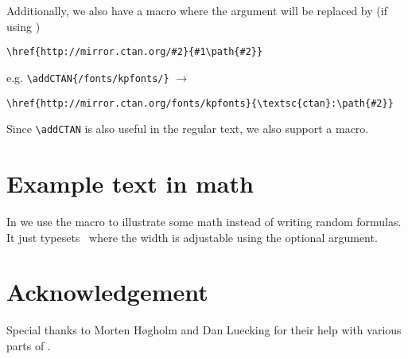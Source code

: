 \documentclass[11pt,oneside,a4paper,oldfontcommands,danish,english,article]{memoir}
\begin{document}
Additionally, we also have a  macro where the
argument will be replaced by (if using )
\begin{verbatim}
\href{http://mirror.ctan.org/#2}{#1\path{#2}}
\end{verbatim}
e.g. \verb+\addCTAN{/fonts/kpfonts/}+ $\to$
\begin{verbatim}
\href{http://mirror.ctan.org/fonts/kpfonts}{\textsc{ctan}:\path{#2}}
\end{verbatim}

Since \verb?\addCTAN? is also useful in the regular text, we also
support a  macro.


\section{Example text in math}
\label{sec:example-text-math}

In \cite{ltxb} we use the macro  to illustrate
some math instead of writing random formulas. It just typesets \dbx\
where the width is adjustable using the optional argument.


\section{Acknowledgement}
\label{sec:acknodlegement}

Special thanks to Morten H\o gholm and Dan Luecking for their help
with various parts of \markup[nomk]{addurl}.




\end{document}
